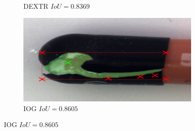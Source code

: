 \begin{figure}
\begin{subfigure}[t]{0.3\textwidth}
		\caption{
			DEXTR $ IoU = 0.8369 $
		}
	\end{subfigure}
	\hfill
	\begin{subfigure}[t]{0.3\textwidth}
		\centering
		\includegraphics[width=\textwidth]{figures/appendix/method_predictions/pill78_iog.png}
		\caption{
			IOG $ IoU = 0.8605 $
		}
	\end{subfigure}
\end{figure}

